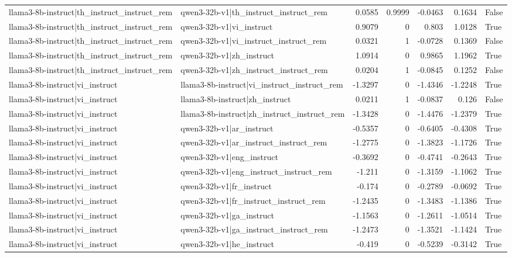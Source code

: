 \begin{table}
\begin{tabular}{l l r r r r l}
llama3-8b-instruct|th_instruct_instruct_rem & qwen3-32b-v1|th_instruct_instruct_rem & 0.0585 & 0.9999 & -0.0463 & 0.1634 & False \\
llama3-8b-instruct|th_instruct_instruct_rem & qwen3-32b-v1|vi_instruct & 0.9079 & 0 & 0.803 & 1.0128 & True \\
llama3-8b-instruct|th_instruct_instruct_rem & qwen3-32b-v1|vi_instruct_instruct_rem & 0.0321 & 1 & -0.0728 & 0.1369 & False \\
llama3-8b-instruct|th_instruct_instruct_rem & qwen3-32b-v1|zh_instruct & 1.0914 & 0 & 0.9865 & 1.1962 & True \\
llama3-8b-instruct|th_instruct_instruct_rem & qwen3-32b-v1|zh_instruct_instruct_rem & 0.0204 & 1 & -0.0845 & 0.1252 & False \\
llama3-8b-instruct|vi_instruct & llama3-8b-instruct|vi_instruct_instruct_rem & -1.3297 & 0 & -1.4346 & -1.2248 & True \\
llama3-8b-instruct|vi_instruct & llama3-8b-instruct|zh_instruct & 0.0211 & 1 & -0.0837 & 0.126 & False \\
llama3-8b-instruct|vi_instruct & llama3-8b-instruct|zh_instruct_instruct_rem & -1.3428 & 0 & -1.4476 & -1.2379 & True \\
llama3-8b-instruct|vi_instruct & qwen3-32b-v1|ar_instruct & -0.5357 & 0 & -0.6405 & -0.4308 & True \\
llama3-8b-instruct|vi_instruct & qwen3-32b-v1|ar_instruct_instruct_rem & -1.2775 & 0 & -1.3823 & -1.1726 & True \\
llama3-8b-instruct|vi_instruct & qwen3-32b-v1|eng_instruct & -0.3692 & 0 & -0.4741 & -0.2643 & True \\
llama3-8b-instruct|vi_instruct & qwen3-32b-v1|eng_instruct_instruct_rem & -1.211 & 0 & -1.3159 & -1.1062 & True \\
llama3-8b-instruct|vi_instruct & qwen3-32b-v1|fr_instruct & -0.174 & 0 & -0.2789 & -0.0692 & True \\
llama3-8b-instruct|vi_instruct & qwen3-32b-v1|fr_instruct_instruct_rem & -1.2435 & 0 & -1.3483 & -1.1386 & True \\
llama3-8b-instruct|vi_instruct & qwen3-32b-v1|ga_instruct & -1.1563 & 0 & -1.2611 & -1.0514 & True \\
llama3-8b-instruct|vi_instruct & qwen3-32b-v1|ga_instruct_instruct_rem & -1.2473 & 0 & -1.3521 & -1.1424 & True \\
llama3-8b-instruct|vi_instruct & qwen3-32b-v1|he_instruct & -0.419 & 0 & -0.5239 & -0.3142 & True \\

\end{tabular}
\end{table}
